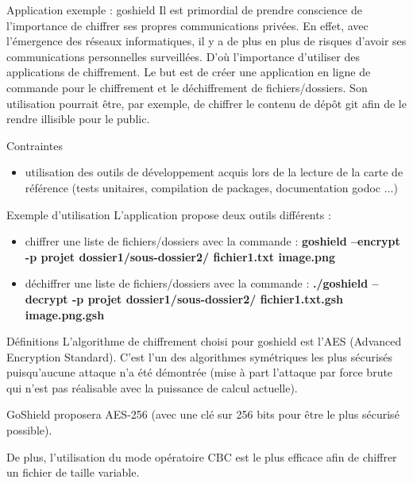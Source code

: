 \documentclass{beamer}
\begin{document}
\begin{frame}
\begin{block}{Application exemple : goshield} 
	Il est primordial de prendre conscience de l'importance de chiffrer ses propres communications privées. En effet, avec l'émergence des réseaux informatiques, il y a de plus en plus de risques d'avoir ses communications personnelles surveillées. D'où l'importance d'utiliser des applications de chiffrement.
	Le but est de créer une application en ligne de commande pour le chiffrement et le déchiffrement de fichiers/dossiers. Son utilisation pourrait être, par exemple, de chiffrer le contenu de dépôt git afin de le rendre illisible pour le public. 
\end{block}

\begin{alertblock}{Contraintes} 
	\begin{itemize}
		[circle]
		\item utilisation des outils de développement acquis lors de la lecture de la carte de référence (tests unitaires, compilation de packages, documentation godoc ...)
	\end{itemize}
\end{alertblock}
\end{frame}

\begin{frame}
\begin{exampleblock}{Exemple d'utilisation}
	L'application propose deux outils différents :  
	\begin{itemize}
		[circle]
		\item chiffrer une liste de fichiers/dossiers avec la commande : \textbf{goshield --encrypt -p projet dossier1/sous-dossier2/ fichier1.txt image.png}
		\item déchiffrer une liste de fichiers/dossiers avec la commande : \textbf{./goshield --decrypt -p projet dossier1/sous-dossier2/ fichier1.txt.gsh image.png.gsh}
	\end{itemize}
\end{exampleblock}
\end{frame}


\begin{frame}
\begin{block}{Définitions} 
	L’algorithme de chiffrement choisi pour goshield est l’AES (Advanced Encryption Standard). C’est l’un des algorithmes symétriques les plus sécurisés puisqu’aucune attaque n’a été démontrée (mise à part l’attaque par force brute qui n’est pas réalisable avec la puissance de calcul actuelle).
	
	GoShield proposera AES-256 (avec une clé sur 256 bits pour être le plus sécurisé possible). 
	
	De plus, l'utilisation du mode opératoire CBC est le plus efficace afin de chiffrer un fichier de taille variable. 
\end{block}
\end{frame}
\end{document}
